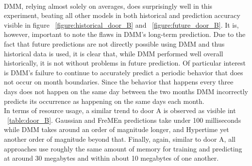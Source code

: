 \begin{table}[h!]
  \centering
  \caption{Door B Data Overview}
  \label{table:door_B}
\end{table} \\

DMM, relying almost solely on averages, does surprisingly well in this
experiment, beating all other models in both historical and prediction
accuracy visible in figure ~\ref{figure:historical_door_B} and ~\ref{figure:future_door_B}. It is, however, important to note the flaws in DMM's long-term
prediction. Due to the fact that future predictions are not directly possible
using DMM and thus historical data is used, it is clear that,
while DMM performed well overall historically, it is not without problems
in future prediction. Of particular interest is DMM's failure to continue to
accurately predict a periodic behavior that does not occur on month
boundaries. Since the behavior that happens every three days does not happen
on the same day between the two months DMM incorrectly predicts its
occurrence as happening on the same days each month. \\

In terms of resource usage, a similar trend to door A is observed as visible
int ~\ref{table:door_B}. Gaussian
and FreMEn predictions take under 100 milliseconds while DMM takes around
an order of magnitude longer, and Hypertime yet another order of magnitude
beyond that. Finally, again, similar to door A, all approaches use roughly the same amount
of memory for training and predicting at around 30 megabytes and
within about 10 megabytes of one another. \\

